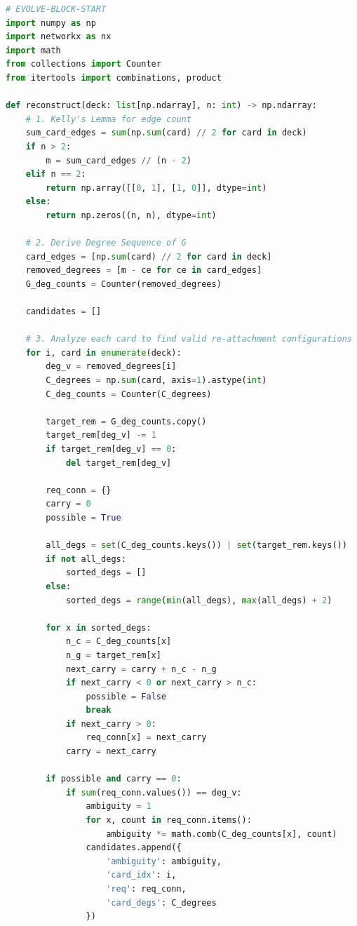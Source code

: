 \documentclass[11pt]{amsart}
\begin{document}
\begin{lstlisting}[language=Python,basicstyle=\ttfamily\small]
# EVOLVE-BLOCK-START
import numpy as np
import networkx as nx
import math
from collections import Counter
from itertools import combinations, product

def reconstruct(deck: list[np.ndarray], n: int) -> np.ndarray:
    # 1. Kelly's Lemma for edge count
    sum_card_edges = sum(np.sum(card) // 2 for card in deck)
    if n > 2:
        m = sum_card_edges // (n - 2)
    elif n == 2:
        return np.array([[0, 1], [1, 0]], dtype=int)
    else:
        return np.zeros((n, n), dtype=int)

    # 2. Derive Degree Sequence of G
    card_edges = [np.sum(card) // 2 for card in deck]
    removed_degrees = [m - ce for ce in card_edges]
    G_deg_counts = Counter(removed_degrees)

    candidates = []

    # 3. Analyze each card to find valid re-attachment configurations
    for i, card in enumerate(deck):
        deg_v = removed_degrees[i]
        C_degrees = np.sum(card, axis=1).astype(int)
        C_deg_counts = Counter(C_degrees)

        target_rem = G_deg_counts.copy()
        target_rem[deg_v] -= 1
        if target_rem[deg_v] == 0:
            del target_rem[deg_v]

        req_conn = {}
        carry = 0
        possible = True

        all_degs = set(C_deg_counts.keys()) | set(target_rem.keys())
        if not all_degs:
            sorted_degs = []
        else:
            sorted_degs = range(min(all_degs), max(all_degs) + 2)

        for x in sorted_degs:
            n_c = C_deg_counts[x]
            n_g = target_rem[x]
            next_carry = carry + n_c - n_g
            if next_carry < 0 or next_carry > n_c:
                possible = False
                break
            if next_carry > 0:
                req_conn[x] = next_carry
            carry = next_carry

        if possible and carry == 0:
            if sum(req_conn.values()) == deg_v:
                ambiguity = 1
                for x, count in req_conn.items():
                    ambiguity *= math.comb(C_deg_counts[x], count)
                candidates.append({
                    'ambiguity': ambiguity,
                    'card_idx': i,
                    'req': req_conn,
                    'card_degs': C_degrees
                })


\end{lstlisting}
\end{document}
